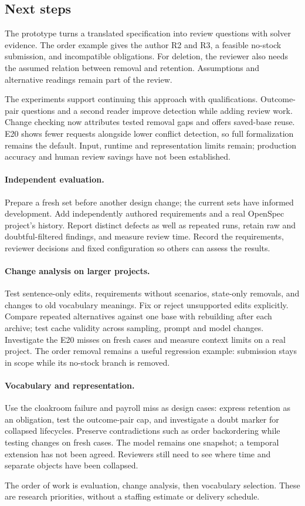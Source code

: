\subsection{Next steps}\label{sec:next}

The prototype turns a translated specification into review questions with solver evidence. The order example gives the author R2 and R3, a feasible no-stock submission, and incompatible obligations. For deletion, the reviewer also needs the assumed relation between removal and retention. Assumptions and alternative readings remain part of the review.

The experiments support continuing this approach with qualifications. Outcome-pair questions and a second reader improve detection while adding review work. Change checking now attributes tested removal gaps and offers saved-base reuse. E20 shows fewer requests alongside lower conflict detection, so full formalization remains the default. Input, runtime and representation limits remain; production accuracy and human review savings have not been established.

\paragraph{Independent evaluation.} Prepare a fresh set before another design change; the current sets have informed development. Add independently authored requirements and a real OpenSpec project's history. Report distinct defects as well as repeated runs, retain raw and doubtful-filtered findings, and measure review time. Record the requirements, reviewer decisions and fixed configuration so others can assess the results.

\paragraph{Change analysis on larger projects.} Test sentence-only edits, requirements without scenarios, state-only removals, and changes to old vocabulary meanings. Fix or reject unsupported edits explicitly. Compare repeated alternatives against one base with rebuilding after each archive; test cache validity across sampling, prompt and model changes. Investigate the E20 misses on fresh cases and measure context limits on a real project. The order removal remains a useful regression example: submission stays in scope while its no-stock branch is removed.

\paragraph{Vocabulary and representation.} Use the cloakroom failure and payroll miss as design cases: express retention as an obligation, test the outcome-pair cap, and investigate a doubt marker for collapsed lifecycles. Preserve contradictions such as order backordering while testing changes on fresh cases. The model remains one snapshot; a temporal extension has not been agreed. Reviewers still need to see where time and separate objects have been collapsed.

The order of work is evaluation, change analysis, then vocabulary selection. These are research priorities, without a staffing estimate or delivery schedule.

